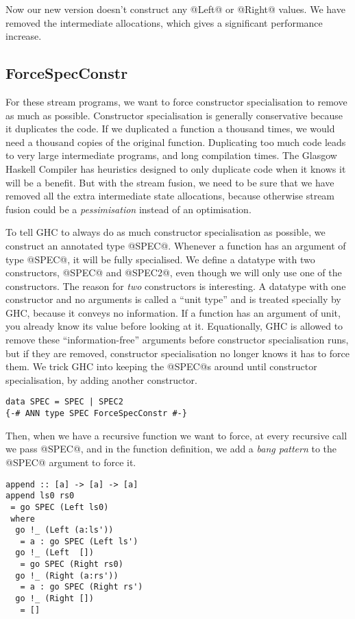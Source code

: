 Now our new version doesn't construct any @Left@ or @Right@ values.
We have removed the intermediate allocations, which gives a significant performance increase.

\subsection{ForceSpecConstr}
For these stream programs, we want to force constructor specialisation to remove as much as possible.
Constructor specialisation is generally conservative because it duplicates the code.
If we duplicated a function a thousand times, we would need a thousand copies of the original function.
Duplicating too much code leads to very large intermediate programs, and long compilation times.
The Glasgow Haskell Compiler has heuristics designed to only duplicate code when it knows it will be a benefit.
But with the stream fusion, we need to be sure that we have removed all the extra intermediate state allocations, because otherwise stream fusion could be a \emph{pessimisation} instead of an optimisation.

To tell GHC to always do as much constructor specialisation as possible, we construct an annotated type @SPEC@. Whenever a function has an argument of type @SPEC@, it will be fully specialised.
We define a datatype with two constructors, @SPEC@ and @SPEC2@, even though we will only use one of the constructors.
The reason for \emph{two} constructors is interesting.
A datatype with one constructor and no arguments is called a ``unit type'' and is treated specially by GHC, because it conveys no information.
If a function has an argument of unit, you already know its value before looking at it.
Equationally, GHC is allowed to remove these ``information-free'' arguments before constructor specialisation runs, but if they are removed, constructor specialisation no longer knows it has to force them.
We trick GHC into keeping the @SPEC@s around until constructor specialisation, by adding another constructor.

\begin{lstlisting}
data SPEC = SPEC | SPEC2
{-# ANN type SPEC ForceSpecConstr #-}
\end{lstlisting}

Then, when we have a recursive function we want to force, at every recursive call we pass @SPEC@, and in the function definition, we add a \emph{bang pattern} to the @SPEC@ argument to force it.
\begin{lstlisting}
append :: [a] -> [a] -> [a]
append ls0 rs0
 = go SPEC (Left ls0)
 where
  go !_ (Left (a:ls'))
   = a : go SPEC (Left ls')
  go !_ (Left  [])
   = go SPEC (Right rs0)
  go !_ (Right (a:rs'))
   = a : go SPEC (Right rs')
  go !_ (Right [])
   = []
\end{lstlisting}

